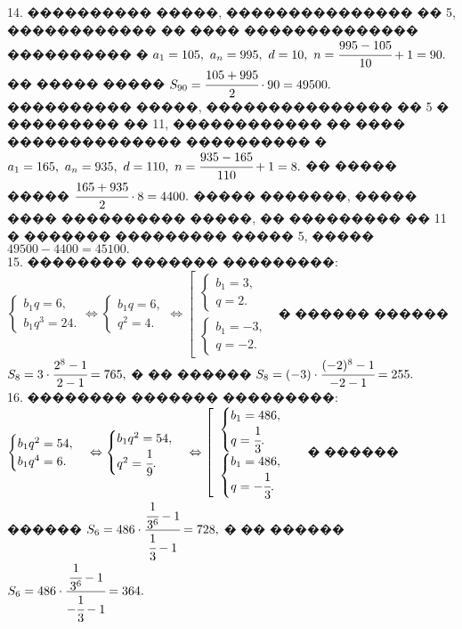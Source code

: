 \documentclass[12pt]{article}
\begin{document}
14. ���������� �����, ��������������� �� 5, ������������ �� ���� �������������� ���������� � $a_1=105,\ a_n=995,\ d=10,\ n=\cfrac{995-105}{10}+1=90.$ �� ����� ����� $S_{90}=\cfrac{105+995}{2}\cdot90=49500.$ ���������� �����, ��������������� �� 5 � ��������� �� 11, ������������ �� ���� �������������� ���������� � $a_1=165,\ a_n=935,\ d=110,\ n=\cfrac{935-165}{110}+1=8.$ �� ����� ����� $\cfrac{165+935}{2}\cdot8=4400.$ ����� �������, ����� ���� ���������� �����, �� ��������� �� 11 � ������� ��������� ����� 5, ����� $49500-4400=45100.$\\
15. �������� ������� ���������: $\begin{cases}b_1q=6,\\b_1q^3=24.\end{cases}\Leftrightarrow\begin{cases}b_1q=6,\\q^2=4.\end{cases}
\Leftrightarrow\left[\begin{array}{l}\begin{cases}b_1=3,\\q=2.\end{cases}\\ \begin{cases}b_1=-3,\\q=-2.\end{cases}\end{array}\right.$ � ������ ������
$S_8=3\cdot\cfrac{2^8-1}{2-1}=765,$ � �� ������ $S_8=(-3)\cdot\cfrac{(-2)^8-1}{-2-1}=255.$\\
16. �������� ������� ���������: $\begin{cases}b_1q^2=54,\\b_1q^4=6.\end{cases}\Leftrightarrow\begin{cases}b_1q^2=54,\\q^2=\cfrac{1}{9}.\end{cases}
\Leftrightarrow\left[\begin{array}{l}\begin{cases}b_1=486,\\q=\cfrac{1}{3}.\end{cases}\\ \begin{cases}b_1=486,\\q=-\cfrac{1}{3}.\end{cases}\end{array}\right.$ � ������ ������
$S_6=486\cdot\cfrac{\cfrac{1}{3^6}-1}{\cfrac{1}{3}-1}=728,$ � �� ������ $S_6=486\cdot\cfrac{\cfrac{1}{3^6}-1}{-\cfrac{1}{3}-1}=364.$\\
\end{document}
